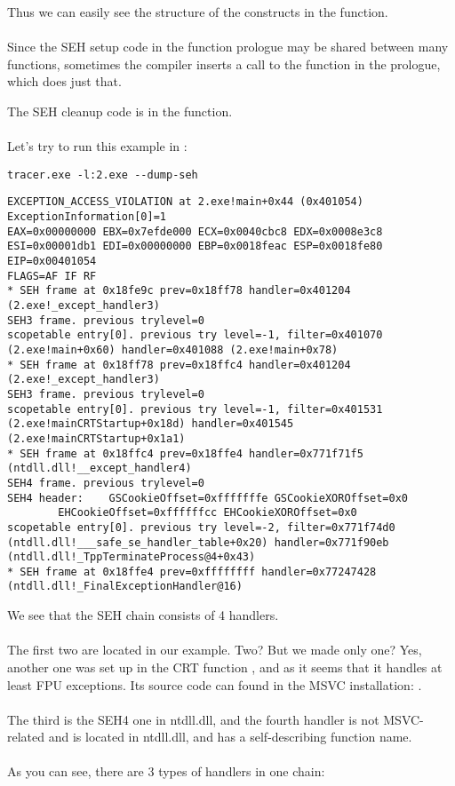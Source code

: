 Thus we can easily see the structure of the  constructs in the function.\\
\\
Since the SEH setup code in the function prologue may be shared between many functions,
sometimes the compiler inserts a call to the  function in the prologue, which does just that.

The SEH cleanup code is in the  function.\\
\\
Let's try to run this example in \tracer{}:

\begin{lstlisting}
tracer.exe -l:2.exe --dump-seh
\end{lstlisting}

\begin{lstlisting}[caption=tracer.exe output]
EXCEPTION_ACCESS_VIOLATION at 2.exe!main+0x44 (0x401054) ExceptionInformation[0]=1
EAX=0x00000000 EBX=0x7efde000 ECX=0x0040cbc8 EDX=0x0008e3c8
ESI=0x00001db1 EDI=0x00000000 EBP=0x0018feac ESP=0x0018fe80
EIP=0x00401054
FLAGS=AF IF RF
* SEH frame at 0x18fe9c prev=0x18ff78 handler=0x401204 (2.exe!_except_handler3)
SEH3 frame. previous trylevel=0
scopetable entry[0]. previous try level=-1, filter=0x401070 (2.exe!main+0x60) handler=0x401088 (2.exe!main+0x78)
* SEH frame at 0x18ff78 prev=0x18ffc4 handler=0x401204 (2.exe!_except_handler3)
SEH3 frame. previous trylevel=0
scopetable entry[0]. previous try level=-1, filter=0x401531 (2.exe!mainCRTStartup+0x18d) handler=0x401545 (2.exe!mainCRTStartup+0x1a1)
* SEH frame at 0x18ffc4 prev=0x18ffe4 handler=0x771f71f5 (ntdll.dll!__except_handler4)
SEH4 frame. previous trylevel=0
SEH4 header:	GSCookieOffset=0xfffffffe GSCookieXOROffset=0x0
		EHCookieOffset=0xffffffcc EHCookieXOROffset=0x0
scopetable entry[0]. previous try level=-2, filter=0x771f74d0 (ntdll.dll!___safe_se_handler_table+0x20) handler=0x771f90eb (ntdll.dll!_TppTerminateProcess@4+0x43)
* SEH frame at 0x18ffe4 prev=0xffffffff handler=0x77247428 (ntdll.dll!_FinalExceptionHandler@16)
\end{lstlisting}

We see that the SEH chain consists of 4 handlers.\\
\\
The first two are located in our example. Two?
But we made only one?
Yes, another one was set up in the \ac{CRT} function , and as it seems that it handles at least \ac{FPU} exceptions.
Its source code can found in the MSVC installation: .\\
\\
The third is the SEH4 one in ntdll.dll, 
and the fourth handler is not MSVC-related and is located in ntdll.dll, and has a self-describing function name.\\
\\
As you can see, there are 3 types of handlers in one chain:

